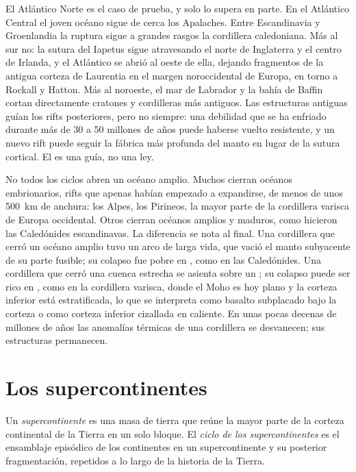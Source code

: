 El Atlántico Norte es el caso de prueba, y solo lo supera en parte. En el Atlántico Central el
joven océano sigue de cerca los Apalaches. Entre Escandinavia y Groenlandia la ruptura
sigue a grandes rasgos la cordillera caledoniana. Más al sur no: la sutura del Iapetus sigue atravesando
el norte de Inglaterra y el centro de Irlanda, y el Atlántico se abrió al oeste de ella, dejando
fragmentos de la antigua corteza de Laurentia en el margen noroccidental de Europa, en torno a Rockall y Hatton.
Más al noroeste, el mar de Labrador y la bahía de Baffin cortan directamente cratones y
cordilleras más antiguos. Las estructuras antiguas guían los rifts posteriores, pero no siempre: una debilidad que se ha enfriado durante más
de 30 a 50 millones de años puede haberse vuelto resistente, y un nuevo rift puede seguir la fábrica más profunda
del manto en lugar de la sutura cortical. El  es una guía, no una ley.

No todos los ciclos abren un océano amplio. Muchos  cierran océanos embrionarios, rifts que apenas habían
empezado a expandirse, de menos de unos \qty{500}{km} de anchura: los Alpes, los Pirineos, la mayor parte de la
cordillera varisca de Europa occidental. Otros cierran océanos amplios y maduros, como hicieron las Caledónides
escandinavas. La diferencia se nota al final. Una cordillera que cerró un océano amplio tuvo un
arco de larga vida, que vació el manto subyacente de su parte fusible; su colapso fue pobre en
, como en las Caledónides. Una cordillera que cerró una cuenca estrecha se asienta sobre un ; su
colapso puede ser rico en , como en la cordillera varisca, donde el Moho es hoy plano y la
corteza inferior está estratificada, lo que se interpreta como basalto subplacado bajo la corteza o como corteza inferior cizallada
en caliente. En unas pocas decenas de millones de años las anomalías
térmicas de una cordillera se desvanecen; sus estructuras permanecen.

\section{Los supercontinentes}\label{sec:b2:wilson-cycle:supercontinents}

\begin{definition}\label{def:b2:wilson-cycle:supercontinent}
Un \emph{supercontinente} es una masa de tierra que reúne la mayor parte de la
corteza continental de la Tierra en un solo bloque. El \emph{ciclo de los supercontinentes} es
el ensamblaje episódico de los continentes en un supercontinente y su posterior
fragmentación, repetidos a lo largo de la historia de la Tierra.
\end{definition}


